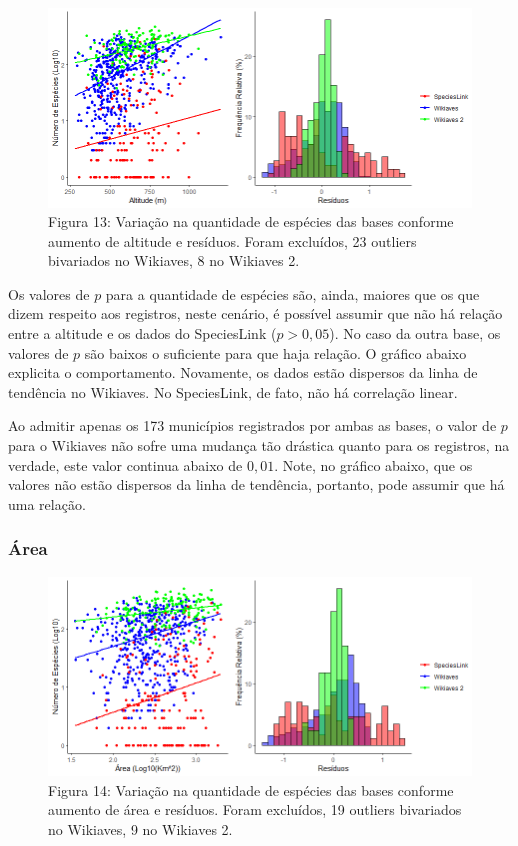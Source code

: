 \documentclass[12pt]{extarticle}
\newenvironment{resposta}{ \color{mygray}}{}
\begin{document}
\begin{figure}[h!]
\centering
\includegraphics[width = 15cm]{Imagens/G06.png}
\\{\scriptsize Figura 13: Variação na quantidade de espécies das bases conforme aumento de altitude e resíduos. Foram excluídos, 23 outliers bivariados no Wikiaves, 8 no Wikiaves 2.}
\end{figure}


\begin{resposta}
Os valores de $p$ para a quantidade de espécies são, ainda, maiores que os que dizem respeito aos registros, neste cenário, é possível assumir que não há relação entre a altitude e os dados do SpeciesLink ($p > 0,05$). No caso da outra base, os valores de $p$ são baixos o suficiente para que haja relação. O gráfico abaixo explicita o comportamento. Novamente, os dados estão dispersos da linha de tendência no Wikiaves. No SpeciesLink, de fato, não há correlação linear.

Ao admitir apenas os 173 municípios registrados por ambas as bases, o valor de $p$ para o Wikiaves não sofre uma mudança tão drástica quanto para os registros, na verdade, este valor continua abaixo de $0,01$. Note, no gráfico abaixo, que os valores não estão dispersos da linha de tendência, portanto, pode assumir que há uma relação.
\end{resposta}

\subsubsection{Área}



\begin{figure}[h!]
\centering
\includegraphics[width = 15cm]{Imagens/G07.png}
\\{\scriptsize Figura 14: Variação na quantidade de espécies das bases conforme aumento de área e resíduos. Foram excluídos, 19 outliers bivariados no Wikiaves, 9 no Wikiaves 2.}
\end{figure}
\end{document}
